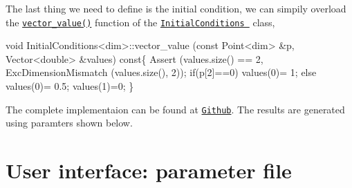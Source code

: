 The last thing we need to define is the initial condition, we can simpily overload the \href{../html/class_initial_conditions.html#aa10cfdd7350c3810a8deab707f397657}{\tt vector\-\_\-value()} function of the \href{../html/class_initial_conditions.html}{\tt Initial\-Conditions } class, 
\begin{DoxyCode}
\textcolor{keywordtype}{void} InitialConditions<dim>::vector_value (\textcolor{keyword}{const} Point<dim>   &p, Vector<double>   &values)\textcolor{keyword}{ const}\{
  Assert (values.size() == 2, ExcDimensionMismatch (values.size(), 2));
    \textcolor{keywordflow}{if}(p[2]==0) values(0)= 1;
  \textcolor{keywordflow}{else} values(0)= 0.5;
    values(1)=0;
\}
\end{DoxyCode}


The complete implementaion can be found at \href{https://github.com/mechanoChem/mechanoChemFEM/tree/example/Example4_growth}{\tt Github}. The results are generated using paramters shown below. \hypertarget{growth_file}{}\section{User interface\-: parameter file}\label{growth_file}


